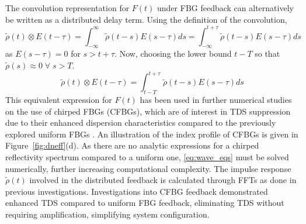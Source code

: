 %
%
\par
%
The convolution representation for $F(t)$ under FBG feedback can alternatively be written as a distributed delay term. Using the definition of the convolution,
%
\begin{equation*}
    \tilde{\rho}(t) \otimes E(t-\tau)
    = \int_{-\infty}^{\infty} \tilde{\rho}(t-s) E(s-\tau) ds 
    = \int_{-\infty}^{t+\tau} \tilde{\rho}(t-s) E(s-\tau) ds
\end{equation*}
%
as $E(s-\tau)=0$ for $s>t+\tau$. Now, choosing the lower bound $t-T$ so that $\tilde{\rho}(s) \approx 0 \; \forall \; s>T$.
%
\begin{equation*}
    \tilde{\rho}(t) \otimes E(t-\tau) = \int_{t-T}^{t+\tau} \tilde{\rho}(t-s) E(s - \tau) ds
\end{equation*}
%
This equivalent expression for $F(t)$ has been used in further numerical studies on the use of chirped FBGs (CFBGs), which are of interest in TDS suppression due to their enhanced dispersion characteristics compared to the previously explored uniform FBGs \cite{wang2017time, wang2019key, wang2023critical, chao2020permutation}. An illustration of the index profile of CFBGs is given in Figure~\ref{fig:dneff}(d). As there are no analytic expressions for a chirped reflectivity spectrum compared to a uniform one, \eqref{eq:wave_eqs} must be solved numerically, further increasing computational complexity. The impulse response $\tilde{\rho}(t)$ involved in the distributed feedback is calculated through FFTs as done in previous investigations. Investigations into CFBG feedback demonstrated enhanced TDS compared to uniform FBG feedback, eliminating TDS without requiring amplification, simplifying system configuration.
%
\par
%
